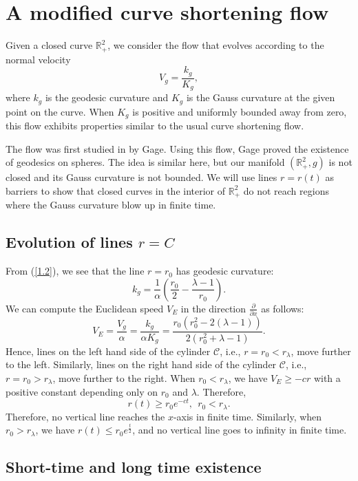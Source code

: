 \documentclass{amsart}
\theoremstyle{Corollary}
\numberwithin{equation}{section}
\begin{document}
\section{A modified curve shortening flow}

Given a closed curve $\mathbb{R}^2_+$,
we consider the flow that evolves according
to the normal velocity
\begin{equation}\label{1.11}
V_g=\frac{k_g}{K_g},
\end{equation}
where $k_g$ is the geodesic curvature and $K_g$ is the Gauss curvature
at the given point on the curve.
When $K_g$ is positive and uniformly bounded away from zero,
this flow exhibits properties similar to the usual curve shortening flow.

The flow was first studied in \cite{Gage} by Gage. 
Using this flow, Gage proved the existence
of geodesics on spheres.
The idea is similar here, but our manifold $(\mathbb{R}^2_+,g)$ is not closed and
its Gauss curvature is not bounded.
We will use lines $r=r(t)$ as barriers to show that
closed curves in the interior of $\mathbb{R}^2_+$
do not reach regions
where the Gauss curvature blow up in finite time.



\subsection{Evolution of lines $r=C$}

From (\ref{1.2}), we see that the line $r=r_0$ has geodesic curvature:
$$k_g=\frac{1}{\alpha}\left(\frac{r_0}{2}-\frac{\lambda-1}{r_0}\right).$$
We can compute the Euclidean speed $V_E$ in the direction $\displaystyle\frac{\partial}{\partial x}$ as follows: 
$$V_E=\frac{V_g}{\alpha}=\frac{k_g}{\alpha K_g}=\frac{r_0(r_0^2-2(\lambda-1))}{2(r_0^2+\lambda-1)}.$$
Hence, lines on the left hand side of the cylinder $\mathcal{C}$, i.e., $r=r_0<r_\lambda$,
move further to the left.
Similarly, lines on the right hand side of the cylinder $\mathcal{C}$, i.e., $r=r_0>r_\lambda$,
move further to the right.
When $r_0<r_\lambda$,
we have
$V_E\geq -cr$ with a positive constant depending only on $r_0$ and $\lambda$. Therefore,
$$r(t)\geq r_0e^{-ct},~~r_0<r_\lambda.$$
Therefore, no vertical line reaches the $x$-axis in finite time. Similarly,
when $r_0>r_\lambda$, we have
$r(t)\leq r_0e^{\frac{t}{2}}$, and no vertical line goes to infinity in finite time.




\subsection{Short-time and long time existence}
\end{document}
